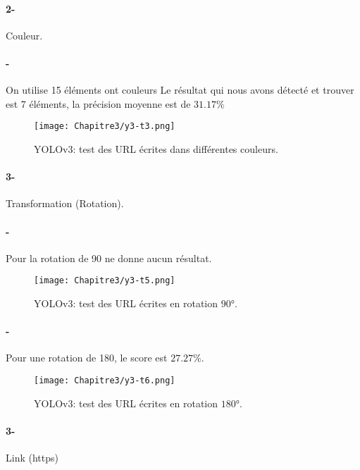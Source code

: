            \paragraph{2-} Couleur.
           \paragraph{-}  On utilise 15 éléments ont couleurs
            Le résultat qui nous avons détecté et trouver est 7 éléments,  la précision moyenne est de $31.17\%$
           \begin{figure}[H]
               \centering
                \texttt{[image: Chapitre3/y3-t3.png]}
                \caption{YOLOv3: test des URL écrites dans différentes couleurs.}
                \label{y3_t3}
                \end{figure}
           
           \paragraph{3-} Transformation (Rotation).
           \paragraph{-} Pour la rotation de 90 ne donne aucun résultat.
           \begin{figure}[H]
               \centering
                \texttt{[image: Chapitre3/y3-t5.png]}
                \caption{YOLOv3: test des URL écrites en rotation $90°$.}
                \label{y3_t5}
                \end{figure}
           
           \paragraph{-} Pour une rotation de 180, le score est $27.27\%$.
           \begin{figure}[H]
               \centering
                \texttt{[image: Chapitre3/y3-t6.png]}
                \caption{YOLOv3: test des URL écrites en rotation $180°$.}
                \label{y3_t6}
                \end{figure}

           \paragraph{3-}Link (https)
